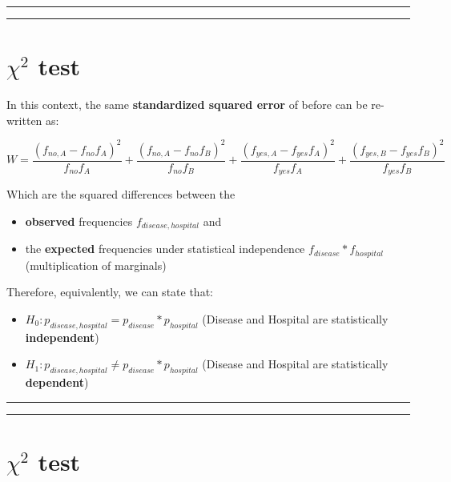 \documentclass[
]{book}
\providecommand{\tightlist}{%
  \setlength{\itemsep}{0pt}\setlength{\parskip}{0pt}}
\begin{document}
\begin{center}\rule{0.5\linewidth}{0.5pt}\end{center}

\begin{center}\rule{0.5\linewidth}{0.5pt}\end{center}

\hypertarget{chi2-test-2}{%
\section{\texorpdfstring{\(\chi^2\) test}{\textbackslash chi\^{}2 test}}\label{chi2-test-2}}

In this context, the same \textbf{standardized squared error} of before can be re-written as:

\[W= \frac{(f_{no,A}-f_{no}f_{A})^2}{f_{no}f_{A}}+\frac{(f_{no,A}-f_{no}f_{B})^2}{f_{no}f_{B}}+\frac{(f_{yes,A}-f_{yes}f_{A})^2}{f_{yes}f_{A}}+\frac{(f_{yes,B}-f_{yes}f_{B})^2}{f_{yes}f_{B}}\]

Which are the squared differences between the

\begin{itemize}
\tightlist
\item
  \textbf{observed} frequencies \(f_{disease, hospital}\) and
\item
  the \textbf{expected} frequencies under statistical independence \(f_{disease}*f_{hospital}\) (multiplication of marginals)
\end{itemize}

Therefore, equivalently, we can state that:

\begin{itemize}
\tightlist
\item
  \(H_0:p_{disease, hospital}=p_{disease}*p_{hospital}\) (Disease and Hospital are statistically \textbf{independent})
\item
  \(H_1:p_{disease, hospital}\neq p_{disease}*p_{hospital}\)
  (Disease and Hospital are statistically \textbf{dependent})
\end{itemize}

\begin{center}\rule{0.5\linewidth}{0.5pt}\end{center}

\begin{center}\rule{0.5\linewidth}{0.5pt}\end{center}

\hypertarget{chi2-test-3}{%
\section{\texorpdfstring{\(\chi^2\) test}{\textbackslash chi\^{}2 test}}\label{chi2-test-3}}
\end{document}
